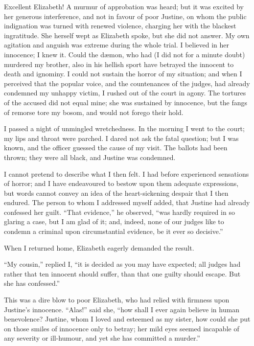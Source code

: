 Excellent Elizabeth! A murmur of
approbation was heard; but it was excited
by her generous interference, and
not in favour of poor Justine, on whom
the public indignation was turned with
renewed violence, charging her with
the blackest ingratitude. She herself
wept as Elizabeth spoke, but she did
not answer. My own agitation and
anguish was extreme during the whole
trial. I believed in her innocence; I
knew it. Could the dæmon, who had
(I did not for a minute doubt) murdered
my brother, also in his hellish
sport have betrayed the innocent to
death and ignominy. I could not sustain
the horror of my situation; and
when I perceived that the popular voice,
and the countenances of the judges, had
already condemned my unhappy victim,
I rushed out of the court in agony.
The tortures of the accused did not
equal mine; she was sustained by innocence,
but the fangs of remorse tore my
bosom, and would not forego their hold.

I passed a night of unmingled wretchedness.
In the morning I went to the
court; my lips and throat were parched.
I dared not ask the fatal question; but
I was known, and the officer guessed
the cause of my visit. The ballots had
been thrown; they were all black, and
Justine was condemned.

I cannot pretend to describe what I
then felt. I had before experienced
sensations of horror; and I have endeavoured
to bestow upon them adequate
expressions, but words cannot convey
an idea of the heart-sickening despair
that I then endured. The person to
whom I addressed myself added, that
Justine had already confessed her guilt.
``That evidence,'' he observed, ``was
hardly required in so glaring a case,
but I am glad of it; and, indeed, none
of our judges like to condemn a criminal
upon circumstantial evidence, be
it ever so decisive.''

When I returned home, Elizabeth
eagerly demanded the result.

``My cousin,'' replied I, ``it is decided
as you may have expected; all
judges had rather that ten innocent
should suffer, than that one guilty should
escape. But she has confessed.''

This was a dire blow to poor Elizabeth,
who had relied with firmness upon
Justine's innocence. ``Alas!'' said
she, ``how shall I ever again believe in
human benevolence? Justine, whom I
loved and esteemed as my sister, how
could she put on those smiles of innocence
only to betray; her mild eyes
seemed incapable of any severity or ill-humour,
and yet she has committed a
murder.''

